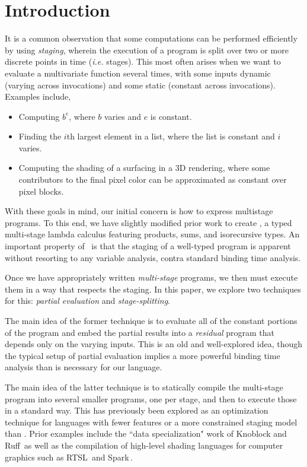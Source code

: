 \documentclass[preprint]{sigplanconf}
\begin{document}
\section{Introduction}

It is a common observation that some computations can be performed efficiently by using {\em staging}, wherein the execution of a program is split over two or more discrete points in time ({\em i.e.} stages).  This most often arises when we want to evaluate a multivariate function several times, with some inputs dynamic (varying across invocations) and some static (constant across invocations).  Examples include,
\begin{itemize}
\item Computing $b^e$, where $b$ varies and $e$ is constant.
\item Finding the $i$th largest element in a list, where the list is constant and $i$ varies.
\item Computing the shading of a surfacing in a 3D rendering, where some contributors to the final pixel color can be approximated as constant over  pixel blocks.  
\end{itemize}

With these goals in mind, our initial concern is how to express multistage programs. To this end, we have slightly modified prior work to create \lang, a typed multi-stage lambda calculus featuring products, sums, and isorecursive types. An important property of \lang\ is that the staging of a well-typed program is apparent without resorting to any variable analysis, contra standard binding time analysis.  

Once we have appropriately written {\em multi-stage} programs, we then must execute them in a way that respects the staging.  In this paper, we explore two techniques for this: {\em partial evaluation} and {\em stage-splitting}.  

The main idea of the former technique is to evaluate all of the constant portions of the program and embed the partial results into a {\em residual} program that depends only on the varying inputs.  This is an old and well-explored idea, though the typical setup of partial evaluation implies a more powerful binding time analysis than is necessary for our language.  

The main idea of the latter technique is to statically compile the multi-stage program into several smaller programs, one per stage, and then to execute those in a standard way.  This has previously been explored as an optimization technique for languages with fewer features or a more constrained staging model than \lang. Prior examples include the ``data specialization" work of Knoblock and Ruff\,\cite{knoblock96} as well as the compilation of high-level shading languages for computer graphics such as RTSL\,\cite{Proudfoot:2001} and Spark\,\cite{Foley:2011}. 
\end{document}
